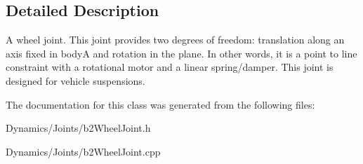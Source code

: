\subsection{Detailed Description}
A wheel joint. This joint provides two degrees of freedom\+: translation along an axis fixed in bodyA and rotation in the plane. In other words, it is a point to line constraint with a rotational motor and a linear spring/damper. This joint is designed for vehicle suspensions. 

The documentation for this class was generated from the following files\+:\begin{DoxyCompactItemize}
\item 
Dynamics/\+Joints/b2\+Wheel\+Joint.\+h\item 
Dynamics/\+Joints/b2\+Wheel\+Joint.\+cpp\end{DoxyCompactItemize}
